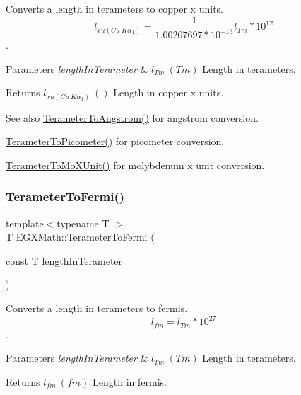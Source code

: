 Converts a length in terameters to copper x units. \[ l_{xu(Cu\ K\alpha_1)}= \frac{1}{1.00207697*10^{-13}} l_{Tm} * 10^{12}\]. 


\begin{DoxyParams}{Parameters}
{\em length\+In\+Terameter} & $ l_{Tm}\ (Tm)$ Length in terameters. \\
\hline
\end{DoxyParams}
\begin{DoxyReturn}{Returns}
$ l_{xu(Cu\ K\alpha_1)}\ ()$ Length in copper x units. 
\end{DoxyReturn}
\begin{DoxySeeAlso}{See also}
\mbox{\hyperlink{group___e_g_x_math-_conversions-_length_conversions-_terameter-_non-_s_i_gaab75399e224bea4ea7ddb8bf5f557ee0}{Terameter\+To\+Angstrom()}} for angstrom conversion. 

\mbox{\hyperlink{group___e_g_x_math-_conversions-_length_conversions-_terameter-_s_i_ga131f3ccf4db05a31f5bd5c9487da9a4e}{Terameter\+To\+Picometer()}} for picometer conversion. 

\mbox{\hyperlink{group___e_g_x_math-_conversions-_length_conversions-_terameter-_non-_s_i_ga391bcf9b529c2e20f2773c699bb0197a}{Terameter\+To\+Mo\+X\+Unit()}} for molybdenum x unit conversion. 
\end{DoxySeeAlso}
\mbox{\label{group___e_g_x_math-_conversions-_length_conversions-_terameter-_non-_s_i_ga5bf639553e4b6e8520f9345def06e492}} 
\subsubsection{\texorpdfstring{Terameter\+To\+Fermi()}{TerameterToFermi()}}
{\footnotesize\ttfamily template$<$typename T $>$ \\
T E\+G\+X\+Math\+::\+Terameter\+To\+Fermi (\begin{DoxyParamCaption}\item[{const T}]{length\+In\+Terameter }\end{DoxyParamCaption})}



Converts a length in terameters to fermis. \[ l_{fm}=l_{Tm} * 10^{27} \]. 


\begin{DoxyParams}{Parameters}
{\em length\+In\+Terameter} & $ l_{Tm}\ (Tm)$ Length in terameters. \\
\hline
\end{DoxyParams}
\begin{DoxyReturn}{Returns}
$ l_{fm}\ (fm)$ Length in fermis. 
\end{DoxyReturn}
\mbox{\label{group___e_g_x_math-_conversions-_length_conversions-_terameter-_non-_s_i_gaa5fdc4aaf15e6428cf443e3d808403a3}} 

